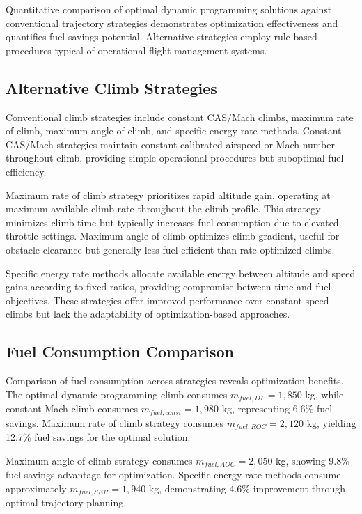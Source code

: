 Quantitative comparison of optimal dynamic programming solutions against conventional trajectory strategies demonstrates optimization effectiveness and quantifies fuel savings potential. Alternative strategies employ rule-based procedures typical of operational flight management systems.

\subsection{Alternative Climb Strategies}

Conventional climb strategies include constant CAS/Mach climbs, maximum rate of climb, maximum angle of climb, and specific energy rate methods. Constant CAS/Mach strategies maintain constant calibrated airspeed or Mach number throughout climb, providing simple operational procedures but suboptimal fuel efficiency.

Maximum rate of climb strategy prioritizes rapid altitude gain, operating at maximum available climb rate throughout the climb profile. This strategy minimizes climb time but typically increases fuel consumption due to elevated throttle settings. Maximum angle of climb optimizes climb gradient, useful for obstacle clearance but generally less fuel-efficient than rate-optimized climbs.

Specific energy rate methods allocate available energy between altitude and speed gains according to fixed ratios, providing compromise between time and fuel objectives. These strategies offer improved performance over constant-speed climbs but lack the adaptability of optimization-based approaches.

\subsection{Fuel Consumption Comparison}

Comparison of fuel consumption across strategies reveals optimization benefits. The optimal dynamic programming climb consumes $m_{fuel,DP} = 1,850$ kg, while constant Mach climb consumes $m_{fuel,const} = 1,980$ kg, representing 6.6\% fuel savings. Maximum rate of climb strategy consumes $m_{fuel,ROC} = 2,120$ kg, yielding 12.7\% fuel savings for the optimal solution.

Maximum angle of climb strategy consumes $m_{fuel,AOC} = 2,050$ kg, showing 9.8\% fuel savings advantage for optimization. Specific energy rate methods consume approximately $m_{fuel,SER} = 1,940$ kg, demonstrating 4.6\% improvement through optimal trajectory planning.

